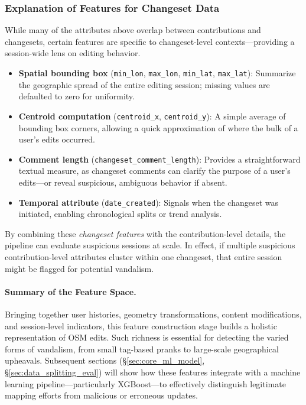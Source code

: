 \documentclass[
    13pt, %
    a4paper, %
    twoside, 
    DIV14, %
    listof=totoc, %
    bibliography=totoc, %
    index=totoc, %
    headsepline
]{scrreprt}
\begin{document}
\subsubsection*{Explanation of Features for Changeset Data}
While many of the attributes above overlap between contributions and changesets, certain features are specific to changeset-level contexts—providing a session-wide lens on editing behavior.

\begin{itemize}
    \item \textbf{Spatial bounding box} (\texttt{min\_lon}, \texttt{max\_lon}, \texttt{min\_lat}, \texttt{max\_lat}): Summarize the geographic spread of the entire editing session; missing values are defaulted to zero for uniformity.
    \item \textbf{Centroid computation} (\texttt{centroid\_x}, \texttt{centroid\_y}): A simple average of bounding box corners, allowing a quick approximation of where the bulk of a user’s edits occurred.
    \item \textbf{Comment length} (\texttt{changeset\_comment\_length}): Provides a straightforward textual measure, as changeset comments can clarify the purpose of a user’s edits—or reveal suspicious, ambiguous behavior if absent.
    \item \textbf{Temporal attribute} (\texttt{date\_created}): Signals when the changeset was initiated, enabling chronological splits or trend analysis.
\end{itemize}

By combining these \emph{changeset features} with the contribution-level details, the pipeline can evaluate suspicious sessions at scale. In effect, if multiple suspicious contribution-level attributes cluster within one changeset, that entire session might be flagged for potential vandalism.

\paragraph{Summary of the Feature Space.}
Bringing together user histories, geometry transformations, content modifications, and session-level indicators, this feature construction stage builds a holistic representation of OSM edits. Such richness is essential for detecting the varied forms of vandalism, from small tag-based pranks to large-scale geographical upheavals. Subsequent sections (\S\ref{sec:core_ml_model}, \S\ref{sec:data_splitting_eval}) will show how these features integrate with a machine learning pipeline—particularly XGBoost—to effectively distinguish legitimate mapping efforts from malicious or erroneous updates.
\end{document}
